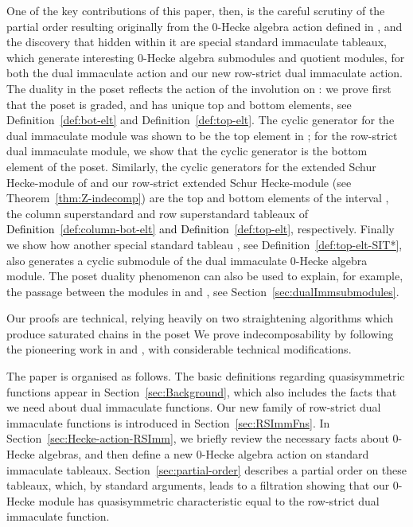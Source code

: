 \documentclass[12pt,letterpaper]{amsart}
\newcommand{\svw}{\textcolor{black}}
\theoremstyle{definition}
\begin{document}
One of the key contributions of this paper, then, is the 
careful scrutiny of the partial order resulting originally from the 0-Hecke algebra action defined in \cite{BBSSZ2015}, and the discovery that hidden within it are special standard immaculate tableaux, which generate interesting 0-Hecke algebra submodules and quotient modules, for both the dual immaculate action and our new row-strict dual immaculate action.
The duality in the poset reflects the action of the involution  on : we prove first that the poset is graded, and has unique top and bottom elements, see Definition~\ref{def:bot-elt} and Definition~\ref{def:top-elt}. The cyclic generator for the dual immaculate module was shown to be the top element in \cite{BBSSZ2015};  for the row-strict dual immaculate module, we show that  the cyclic generator is the  bottom element of the poset.  Similarly, the cyclic generators for the extended Schur Hecke-module of \cite{S2020} and our row-strict extended Schur Hecke-module (see Theorem~\ref{thm:Z-indecomp}) are the top and bottom elements of the interval , the column superstandard and row superstandard tableaux of   \svw{Definition~\ref{def:column-bot-elt} and Definition~\ref{def:top-elt}}, respectively.
Finally we show how another special standard tableau , see Definition~\ref{def:top-elt-SIT*}, also generates a cyclic submodule of the dual immaculate 0-Hecke algebra module.
The poset duality phenomenon can also be used to explain, for example, the passage between the modules in \cite{TvW2015} and \cite{BS2021}, see  Section~\ref{sec:dualImmsubmodules}. 

Our proofs are technical,  relying heavily on two  straightening algorithms which produce saturated chains in the poset    We prove  indecomposability by following the pioneering work in \cite{TvW2015} and  \cite{BBSSZ2015},  with considerable technical modifications.

The paper is organised as follows.  The basic definitions regarding quasisymmetric functions appear in Section~\ref{sec:Background}, which also includes the facts that we need about dual immaculate functions. Our new family of row-strict dual immaculate functions is introduced in Section~\ref{sec:RSImmFns}. In  Section~\ref{sec:Hecke-action-RSImm}, we briefly review the necessary facts about 0-Hecke algebras, and then define a new  0-Hecke algebra action on standard immaculate tableaux. Section~\ref{sec:partial-order} describes a partial order on these tableaux, which, by standard arguments, leads to a filtration showing that our 0-Hecke module has quasisymmetric characteristic equal to the row-strict dual immaculate function.
\end{document}
